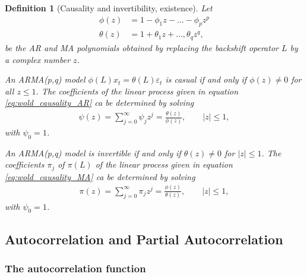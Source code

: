 \documentclass[
paper=128mm:96mm, %
fontsize=9.5pt, %
pagesize, %
parskip=half-, %
]{scrartcl} %
\theoremstyle{mythmstyle} %
\newtheorem{definition}[theorem]{Definition} %
\begin{document}
\begin{definition}[Causality and invertibility, existence]
Let 
\begin{align}
\phi(z)&=1-\phi_1z-\dots-\phi_pz^p\nonumber\\
\theta(z)&=1+\theta_1z+\dots,\theta_qz^q,\nonumber
\end{align}
be the AR and MA polynomials obtained by replacing the backshift operator $L$ by a complex number $z$. 

An ARMA(p,q) model $\phi(L)x_t=\theta(L)\varepsilon_t$ is casual if and only if $\phi(z)\neq 0$ for all $z\leq 1$. The coefficients of the linear process given in equation \eqref{eq:wold_causality_AR} ca be determined by solving 
\begin{align}
\psi(z)=\sum_{j=0}^\infty\psi_jz^j=\frac{\theta(z)}{\phi(z)},\qquad\vert z\vert\leq 1,\nonumber
\end{align}
with $\psi_0=1$. 

An ARMA(p,q) model is invertible if and only if $\theta(z)\neq 0$ for $\vert z\vert\leq 1$. The coefficients $\pi_j$ of $\pi(L)$ of the linear process given in equation \eqref{eq:wold_causality_MA} ca be determined by solving 
\begin{align}
\pi(z)=\sum_{j=0}^\infty\pi_jz^j=\frac{\phi(z)}{\theta(z)},\qquad\vert z\vert\leq 1,\nonumber
\end{align}
with $\psi_0=1$. 
\end{definition}








\clearpage
\subsection{Autocorrelation and Partial Autocorrelation}


\subsubsection{The autocorrelation function}
\end{document}
